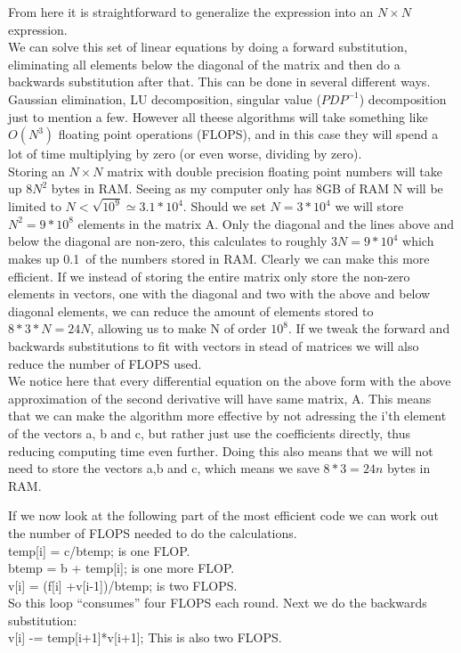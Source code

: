 \documentclass[a4paper,english, 10pt, twoside]{article}
\begin{document}
From here it is straightforward to generalize the expression into an $N\times N$ expression.\\
We can solve this set of linear equations by doing a forward substitution, eliminating all elements below the diagonal of the 
matrix and then do a backwards substitution after that. This can be done in several different ways. Gaussian elimination, 
LU decomposition, singular value ($PDP^{-1}$) decomposition just to mention a few. However all theese algorithms will take 
something like $O(N^3)$ floating point operations (FLOPS), and in this case they will spend a lot of time multiplying by zero 
(or even worse, dividing by zero). \\
Storing an $N \times N$ matrix with double precision floating point numbers will take up $8N^2$ bytes in RAM. Seeing as my 
computer only has 8GB of RAM N will be limited to $N< \sqrt{10^9} \simeq 3.1*10^4$. Should we set $N = 3*10^4$ we will store
$N^2 = 9*10^8$ elements in the matrix A. Only the diagonal and the lines above and below the diagonal are non-zero, this 
calculates to roughly $3N = 9*10^4$ which makes up 0.1\textperthousand \  of the numbers stored in RAM. Clearly we can make this more 
efficient. If we instead of storing the entire matrix only store the non-zero elements in vectors, one with the diagonal and two 
with the above and below diagonal elements, we can reduce the amount of elements stored to $8*3*N = 24N$, allowing us to make N 
of order $10^8$. If we tweak the forward and backwards substitutions to fit with vectors in stead of matrices we will also reduce 
the number of FLOPS used.\\
We notice here that every differential equation on the above form with the above approximation of the second derivative will 
have same matrix, A. This means that we can make the algorithm more effective by not adressing the i'th element of the 
vectors a, b and c, but rather just use the coefficients directly, thus reducing computing time even further. Doing this also 
means that we will not need to store the vectors a,b and c, which means we save $8*3 = 24n$ bytes in RAM.

If we now look at the following part of the most efficient code we can work out the number of FLOPS needed to do the calculations.\\

temp[i] = c/btemp; is one FLOP.\\
btemp = b + temp[i]; is one more FLOP.\\
v[i] = (f[i] +v[i-1])/btemp; is two FLOPS.\\
So this loop ``consumes'' four FLOPS each round. Next we do the backwards substitution:\\
v[i] -= temp[i+1]*v[i+1]; This is also two FLOPS.\\ \\
\end{document}
